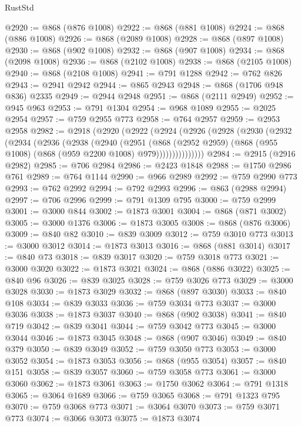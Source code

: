 \begin{lexlean}{RustStd}
\begin{coremodule}
@2920 := @868 (@876 @1008)
@2922 := @868 (@881 @1008)
@2924 := @868 (@886 @1008)
@2926 := @868 (@2089 @1008)
@2928 := @868 (@897 @1008)
@2930 := @868 (@902 @1008)
@2932 := @868 (@907 @1008)
@2934 := @868 (@2098 @1008)
@2936 := @868 (@2102 @1008)
@2938 := @868 (@2105 @1008)
@2940 := @868 (@2108 @1008)
@2941 := @791 @1288
@2942 := @762 @826
@2943 := @2941 @2942
@2944 := @865 @2943
@2948 := @868 (@1706 @948 @836) @2335
@2949 := @2944 @2948
@2951 := @868 (@2111 @2949)
@2952 := @945 @963
@2953 := @791 @1304
@2954 := @968 @1089
@2955 := @2025 @2954
@2957 := @759 @2955 @773
@2958 := @764 @2957
@2959 := @2953 @2958
@2982 := @2918
    (@2920
      (@2922
        (@2924
          (@2926
            (@2928
              (@2930
                (@2932
                  (@2934
                    (@2936
                      (@2938
                        (@2940
                          (@2951
                            (@868
                              (@2952 @2959)
                              (@868 (@955 @1008) (@868 (@959 @2200 @1008) @979)))))))))))))))
@2984 := @2915 (@2916 @2982)
@2985 := @706 @2984
@2986 := @2423 @1848
@2988 := @1750 @2986 @761
@2989 := @764 @1144
@2990 := @966 @2989
@2992 := @759 @2990 @773
@2993 := @762 @2992
@2994 := @792 @2993
@2996 := @863 (@2988 @2994)
@2997 := @706 @2996
@2999 := @791 @1309 @795
@3000 := @759 @2999
@3001 := @3000 @844
@3002 := @1873 @3001
@3004 := @868 (@871 @3002)
@3005 := @3000 @1376
@3006 := @1873 @3005
@3008 := @868 (@876 @3006)
@3009 := @840 @82
@3010 := @839 @3009
@3012 := @759 @3010 @773
@3013 := @3000 @3012
@3014 := @1873 @3013
@3016 := @868 (@881 @3014)
@3017 := @840 @73
@3018 := @839 @3017
@3020 := @759 @3018 @773
@3021 := @3000 @3020
@3022 := @1873 @3021
@3024 := @868 (@886 @3022)
@3025 := @840 @96
@3026 := @839 @3025
@3028 := @759 @3026 @773
@3029 := @3000 @3028
@3030 := @1873 @3029
@3032 := @868 (@897 @3030)
@3033 := @840 @108
@3034 := @839 @3033
@3036 := @759 @3034 @773
@3037 := @3000 @3036
@3038 := @1873 @3037
@3040 := @868 (@902 @3038)
@3041 := @840 @719
@3042 := @839 @3041
@3044 := @759 @3042 @773
@3045 := @3000 @3044
@3046 := @1873 @3045
@3048 := @868 (@907 @3046)
@3049 := @840 @379
@3050 := @839 @3049
@3052 := @759 @3050 @773
@3053 := @3000 @3052
@3054 := @1873 @3053
@3056 := @868 (@955 @3054)
@3057 := @840 @151
@3058 := @839 @3057
@3060 := @759 @3058 @773
@3061 := @3000 @3060
@3062 := @1873 @3061
@3063 := @1750 @3062
@3064 := @791 @1318
@3065 := @3064 @1689
@3066 := @759 @3065
@3068 := @791 @1323 @795
@3070 := @759 @3068 @773
@3071 := @3064 @3070
@3073 := @759 @3071 @773
@3074 := @3066 @3073
@3075 := @1873 @3074

\end{coremodule}
\end{lexlean}
